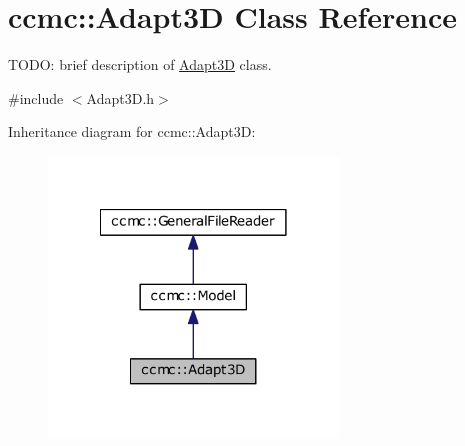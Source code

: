 \hypertarget{classccmc_1_1_adapt3_d}{\section{ccmc\-:\-:Adapt3\-D Class Reference}
\label{classccmc_1_1_adapt3_d}
}


T\-O\-D\-O\-: brief description of \hyperlink{classccmc_1_1_adapt3_d}{Adapt3\-D} class.  




{\ttfamily \#include $<$Adapt3\-D.\-h$>$}



Inheritance diagram for ccmc\-:\-:Adapt3\-D\-:\nopagebreak
\begin{figure}[H]
\begin{center}
\leavevmode
\includegraphics[width=218pt]{classccmc_1_1_adapt3_d__inherit__graph}
\end{center}
\end{figure}


